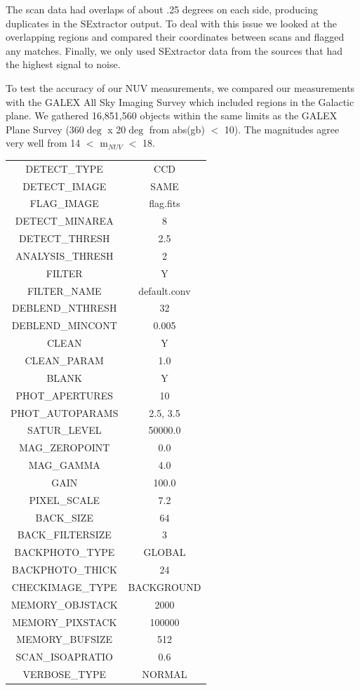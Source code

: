 \documentclass[12pt, preprint]{aastex}
\begin{document}
The scan data had overlaps of about .25 degrees on each side, producing duplicates in the SExtractor output. To deal with this issue we looked at the overlapping regions and compared their coordinates between scans and flagged any matches. Finally, we only used SExtractor data from the sources that had the highest signal to noise.

To test the accuracy of our NUV measurements, we compared our measurements with the GALEX All Sky Imaging Survey which included regions in the Galactic plane. We gathered 16,851,560 objects within the same limits as the GALEX Plane Survey (360$\deg$ x 20$\deg$ from abs(gb) $<$ 10). The magnitudes agree very well from 14 $<$ m$_{NUV}$ $<$ 18. 

\begin{table}
\begin{tabular}{cc}
DETECT\_TYPE & CCD \\
DETECT\_IMAGE & SAME \\
FLAG\_IMAGE & flag.fits \\
DETECT\_MINAREA & 8 \\
DETECT\_THRESH & 2.5 \\
ANALYSIS\_THRESH & 2 \\
FILTER & Y \\
FILTER\_NAME & default.conv \\
DEBLEND\_NTHRESH & 32 \\
DEBLEND\_MINCONT & 0.005 \\
CLEAN & Y \\
CLEAN\_PARAM & 1.0 \\
BLANK & Y \\
PHOT\_APERTURES & 10 \\
PHOT\_AUTOPARAMS & 2.5,  3.5 \\
SATUR\_LEVEL & 50000.0 \\
MAG\_ZEROPOINT & 0.0 \\
MAG\_GAMMA & 4.0 \\
GAIN & 100.0 \\
PIXEL\_SCALE & 7.2 \\
BACK\_SIZE & 64 \\
BACK\_FILTERSIZE & 3 \\
BACKPHOTO\_TYPE & GLOBAL \\
BACKPHOTO\_THICK & 24 \\
CHECKIMAGE\_TYPE & BACKGROUND \\
MEMORY\_OBJSTACK & 2000 \\
MEMORY\_PIXSTACK & 100000 \\
MEMORY\_BUFSIZE & 512 \\
SCAN\_ISOAPRATIO & 0.6 \\
VERBOSE\_TYPE & NORMAL \\
\end{tabular}
\end{table}
\end{document}
